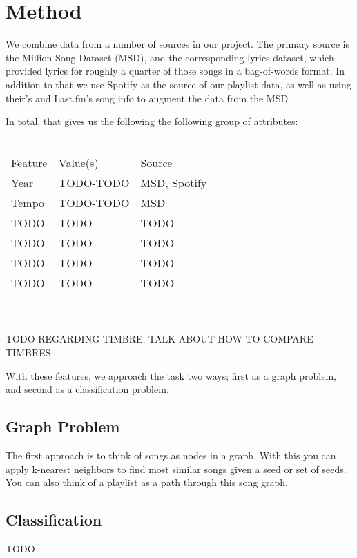 \documentclass[10pt,journal,compsoc]{IEEEtran}
\begin{document}
\section{Method}
We combine data from a number of sources in our project. The primary source is the Million Song Dataset \cite{msd} (MSD), and the corresponding lyrics dataset, which provided lyrics for roughly a quarter of those songs in a bag-of-words format. In addition to that we use Spotify \cite{spotify} as the source of our playlist data, as well as using their's and Last.fm's \cite{lastfm} song info to augment the data from the MSD.

In total, that gives us the following the following group of attributes:
\\\\
\begin{tabular}{lll}
Feature    & Value(s)       & Source          \\
Year       & TODO-TODO      & MSD, Spotify    \\
Tempo      & TODO-TODO      & MSD             \\
TODO       & TODO           & TODO            \\
TODO       & TODO           & TODO            \\
TODO       & TODO           & TODO            \\
TODO       & TODO           & TODO            \\
\end{tabular}
\\\\
TODO REGARDING TIMBRE, TALK ABOUT HOW TO COMPARE TIMBRES

With these features, we approach the task two ways; first as a graph problem, and second as a classification problem.

\subsection{Graph Problem}
The first approach is to think of songs as nodes in a graph. With this you can apply k-nearest neighbors to find most similar songs given a seed or set of seeds. You can also think of a playlist as a path through this song graph. \cite{Alghoniemy01anetwork}

\subsection{Classification}
TODO
\end{document}
